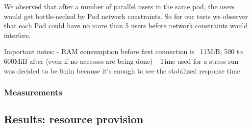 We observed that after a number of parallel users in the same pod, the users would get bottle-necked by Pod network constraints. So for our tests we observer that each Pod could have no more than 5 users before network constraints would interfere.

Important notes:
- RAM consumption before first connection is ~11MiB, 500 to 600MiB after (even if no accesses are being done)
- Time used for a stress run was decided to be 6min because it's enough to see the stabilized response time

\subsubsection*{Measurements}

\subsection{Results: resource provision}
